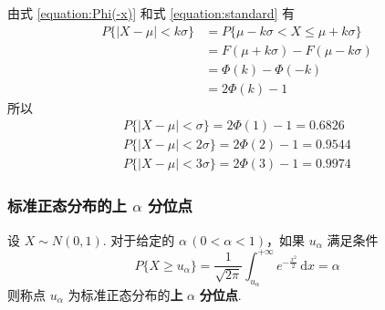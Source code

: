 \vspace{-1.7em}

\begin{myproof}
    由式 \eqref{equation:Phi(-x)} 和式 \eqref{equation:standard} 有
    $$
    \begin{aligned}
        P\{|X-\mu| < k \sigma\} &= P\{\mu - k \sigma < X \leqslant \mu + k \sigma\} \\
        &= F(\mu+k\sigma) - F(\mu-k\sigma) \\
        &= \varPhi(k)-\varPhi(-k) \\
        &= 2\varPhi(k)-1
    \end{aligned}
    $$
    所以
    \begin{gather*}
        P\{|X-\mu|<\sigma\}=2\varPhi(1)-1=0.6826\\
        P\{|X-\mu|<2\sigma\}=2\varPhi(2)-1=0.9544\\
        P\{|X-\mu|<3\sigma\}=2\varPhi(3)-1=0.9974
    \end{gather*}
\end{myproof}

\subsubsection{标准正态分布的上 $\alpha$ 分位点}

\vspace{-1em}

\begin{definition}
    设 $X \sim N(0,1)$. 对于给定的 $\alpha \, (0 < \alpha < 1)$，如果 $u_{\alpha}$ 满足条件
    $$
    P\{X \geqslant u_{\alpha}\} = \dfrac{1}{\sqrt{2\pi}} \int_{u_{\alpha}}^{+\infty} e^{-\frac{x^2}{2}} \, \text{d}x = \alpha
    $$
    则称点 $u_{\alpha}$ 为标准正态分布的\textbf{上} $\alpha$ \textbf{分位点}.
\end{definition}

\vspace{-0.5em}

